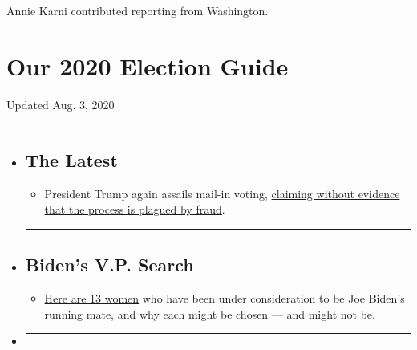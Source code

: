 Annie Karni contributed reporting from Washington.

\hypertarget{our-2020-election-guide}{%
\section{Our 2020 Election Guide}\label{our-2020-election-guide}}

Updated Aug. 3, 2020

\begin{itemize}
\item
  \begin{center}\rule{0.5\linewidth}{\linethickness}\end{center}

  \hypertarget{the-latest}{%
  \subsection{The Latest}\label{the-latest}}

  \begin{itemize}
  \tightlist
  \item
    President Trump again assails mail-in voting,
    \href{https://www.nytimes3xbfgragh.onion/2020/08/03/us/politics/trump-mail-in-voting.html?action=click\&pgtype=Article\&state=default\&region=BELOW_MAIN_CONTENT\&context=storylines_guide}{claiming
    without evidence that the process is plagued by fraud}.
  \end{itemize}
\item
  \begin{center}\rule{0.5\linewidth}{\linethickness}\end{center}

  \hypertarget{bidens-vp-search}{%
  \subsection{Biden's V.P. Search}\label{bidens-vp-search}}

  \begin{itemize}
  \tightlist
  \item
    \href{https://www.nytimes3xbfgragh.onion/article/biden-vice-president-2020.html?action=click\&pgtype=Article\&state=default\&region=BELOW_MAIN_CONTENT\&context=storylines_guide}{Here
    are 13 women} who have been under consideration to be Joe Biden's
    running mate, and why each might be chosen --- and might not be.
  \end{itemize}
\item
  \begin{center}\rule{0.5\linewidth}{\linethickness}\end{center}


\end{itemize}
